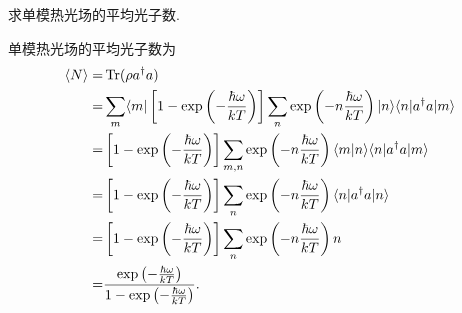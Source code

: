 \documentclass{assignment}
\begin{document}
\begin{prob}
    求单模热光场的平均光子数.
\end{prob}
\begin{sol}
    单模热光场的平均光子数为
    \begin{align}
        \notag\langle N\rangle=&\operatorname{Tr}(\rho a^{\dagger}a)\\
        \notag=&\sum_m\langle m\rvert\left[1-\exp\left(-\frac{\hbar\omega}{kT}\right)\right]\sum_n\exp\left(-n\frac{\hbar\omega}{kT}\right)\lvert n\rangle\langle n\rvert a^{\dagger}a\lvert m\rangle\\
        \notag=&\left[1-\exp\left(-\frac{\hbar\omega}{kT}\right)\right]\sum_{m,n}\exp\left(-n\frac{\hbar\omega}{kT}\right)\langle m\vert n\rangle\langle n\rvert a^{\dagger}a\lvert m\rangle\\
        \notag=&\left[1-\exp\left(-\frac{\hbar\omega}{kT}\right)\right]\sum_n\exp\left(-n\frac{\hbar\omega}{kT}\right)\langle n\rvert a^{\dagger}a\lvert n\rangle\\
        \notag=&\left[1-\exp\left(-\frac{\hbar\omega}{kT}\right)\right]\sum_n\exp\left(-n\frac{\hbar\omega}{kT}\right)n\\
        \notag=&\frac{\exp\left(-\frac{\hbar\omega}{kT}\right)}{1-\exp\left(-\frac{\hbar\omega}{kT}\right)}.
    \end{align}
\end{sol}
\end{document}
